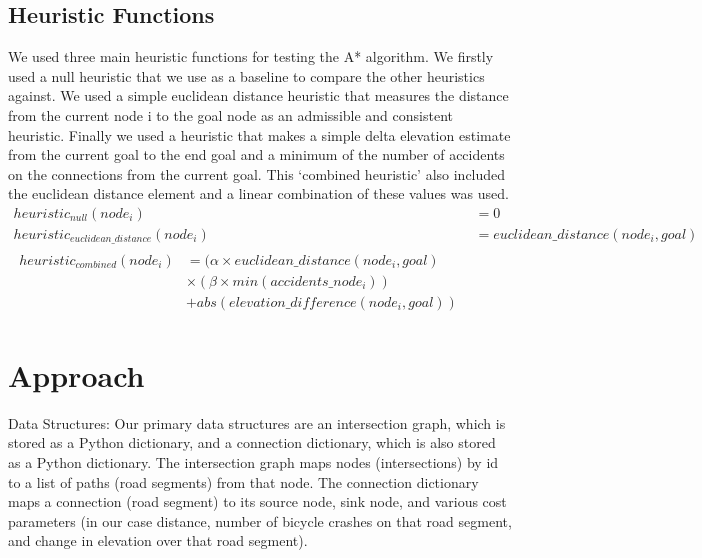 \documentclass[11pt]{article}
\begin{document}
\subsection{Heuristic Functions}
We used three main heuristic functions for testing the A* algorithm. We firstly used a null heuristic that we use as a baseline to compare the other heuristics against. We used a simple euclidean distance heuristic that measures the distance from the current node i to the goal node as an admissible and consistent heuristic. Finally we used a heuristic that makes a simple delta elevation estimate from the current goal to the end goal and a minimum of the number of accidents on the connections from the current goal. This `combined heuristic' also included the euclidean distance element and a linear combination of these values was used.
\begin{align}\label{heuristic_fns}
heuristic_{null}(node_i) &= 0 \\
heuristic_{euclidean\_distance}(node_i) &= euclidean\_distance(node_i, goal)\\
\begin{split}
heuristic_{combined}(node_i) &= (\alpha \times euclidean\_distance(node_i, goal) \\ &\times  (\beta \times min(accidents\_node_i)) \\&+ abs(elevation\_difference(node_i, goal))
\end{split}
\end{align}

\section{Approach}

Data Structures: Our primary data structures are an intersection graph, which is stored as a Python dictionary, and a connection dictionary, which is also stored as a Python dictionary. The intersection graph maps nodes (intersections) by id to a list of paths (road segments) from that node. The connection dictionary maps a connection (road segment) to its source node, sink node, and various cost parameters (in our case distance, number of bicycle crashes on that road segment, and change in elevation over that road segment).
\end{document}
